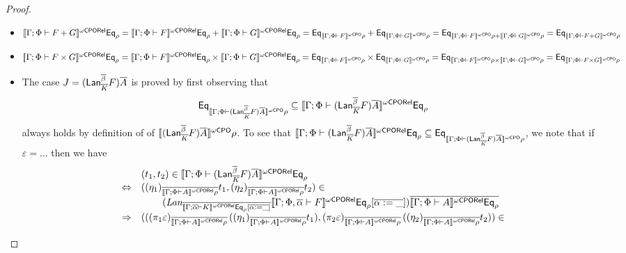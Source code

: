 \documentclass[acmsmall,review,anonymous]{acmart}
\theoremstyle{definition}
\begin{document}
\begin{proof}
\begin{itemize}
\begin{itemize}
\end{itemize}
\item $\oCPORsem{\Gamma; \Phi \vdash F + G} \Eq_{\rho} =
  \oCPORsem{\Gamma; \Phi \vdash F} \Eq_{\rho} + \oCPORsem{\Gamma;
    \Phi \vdash G} \Eq_{\rho} = \Eq_{\oCPOsem{\Gamma; \Phi \vdash
      F}\rho} + \Eq_{\oCPOsem{\Gamma; \Phi \vdash G}\rho} =
  \Eq_{\oCPOsem{\Gamma; \Phi \vdash F}\rho + \oCPOsem{\Gamma; \Phi
      \vdash G}\rho} = \Eq_{\oCPOsem{\Gamma; \Phi \vdash F +
      G}\rho}$
\item $\oCPORsem{\Gamma; \Phi \vdash F \times G} \Eq_{\rho} =
  \oCPORsem{\Gamma; \Phi \vdash F}\Eq_{\rho} \times \oCPORsem{\Gamma;
    \Phi \vdash G}\Eq_{\rho} = \Eq_{\oCPOsem{\Gamma; \Phi \vdash
      F}\rho} \times \Eq_{\oCPOsem{\Gamma; \Phi \vdash G}\rho}
  = \Eq_{\oCPOsem{\Gamma; \Phi \vdash F}\rho \times
    \oCPOsem{\Gamma; \Phi \vdash G}\rho} = \Eq_{\oCPOsem{\Gamma;
      \Phi \vdash F \times G}\rho}$
\item The case $J = (\Lan_{\ol K}^{\ol \beta} F)\ol{A}$ is proved
  by first observing that \[\Eq_{\oCPOsem{\Gamma; \Phi \vdash
      (\Lan_{\ol K}^{\ol \beta} F)\ol{A}}\rho} \subseteq
  \oCPORsem{\Gamma; \Phi \vdash (\Lan_{\ol K}^{\ol \beta}
    F)\ol{A}}\Eq_\rho\] always holds by definition of of
  $\oCPOsem{(\Lan_{\ol K}^{\ol\beta} F)\ol{A}}\rho$. To see that
  $\oCPORsem{\Gamma; \Phi \vdash (\Lan_{\ol K}^{\ol \beta}
    F)\ol{A}}\Eq_\rho \subseteq \Eq_{\oCPOsem{\Gamma; \Phi \vdash
      (\Lan_{\ol K}^{\ol \beta} F)\ol{A}}\rho}$, we note that if
           {\color{blue} $\varepsilon = ...$} then we have
\[\begin{array}{ll}
 & (t_1,t_2) \in \oCPORsem{\Gamma; \Phi \vdash (\Lan_{\ol K}^{\ol \beta}
  F)\ol{A}}\Eq_\rho\\
\Leftrightarrow & ( (\eta_1)_{\ol{\oCPORsem{\Gamma;\Phi \vdash
      A}\rho}} t_1, (\eta_2)_{\ol{\oCPORsem{\Gamma;\Phi \vdash A}
    \rho}} t_2) \in\\
& \hspace*{0.3in}(\textit{Lan}_{\ol{\oCPORsem{\Gamma; \ol\alpha
      \vdash K}\Eq_\rho[\ol{\alpha := \_}]}} \oCPORsem{\Gamma; \Phi,
  \ol\alpha \vdash F}\Eq_\rho[\ol{\alpha := \_}]) \ol{\oCPORsem{\Gamma;
    \Phi \vdash A}\Eq_\rho}\\
\Rightarrow & (((\pi_1 \varepsilon)_{\ol{\oCPORsem{\Gamma;\Phi \vdash 
      A}\rho}} \,((\eta_1)_{\ol{\oCPORsem{\Gamma;\Phi \vdash 
      A}\rho}} t_1), (\pi_2 \varepsilon)_{\ol{\oCPORsem{\Gamma;\Phi \vdash 
      A}\rho}} \,
((\eta_2)_{\ol{\oCPORsem{\Gamma;\Phi \vdash A} \rho}} t_2)) \in\\

\end{array}\]
\end{itemize}
\end{proof}
\end{document}
